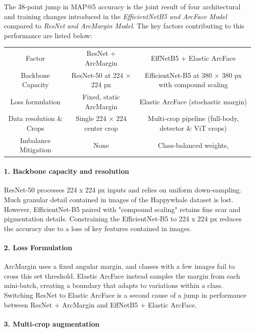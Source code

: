 \documentclass[twocolumn]{article}
\begin{document}
The 38-point jump in MAP@5 accuracy is the joint result of four architectural and training changes introduced in the \textit{EfficientNetB5 and ArcFace Model} compared to \textit{ResNet and ArcMargin Model}. The key factors contributing to this performance are listed below:

\begin{table}
    \centering
    \begin{tabular}{ccc}
         Factor&  ResNet + ArcMargin& EffNetB5 + Elastic ArcFace\\
         Backbone Capacity&  ResNet-50 at 224 × 224 px& EfficientNet-B5 at 380 × 380 px with compound scaling\\
         Loss formulation&  Fixed, static ArcMargin& Elastic ArcFace (stochastic margin)\\
         Data resolution \& Crops&  Single 224 × 224 center crop& Multi-crop pipeline (full-body, detector \& ViT crops)\\
         Imbalance Mitigation&  None& Class-balanced weights,\\
    \end{tabular}
    \label{tab:my_label}
\end{table}

\paragraph{1. Backbone capacity and resolution}

ResNet-50 processes 224 x 224 px inputs and relies on uniform down-sampling. Much granular detail contained in images of the Happywhale dataset is lost. However, EfficientNet-B5 paired with "compound scaling" retains fine scar and pigmentation details. Constraining the EfficientNet-B5 to 224 x 224 px reduces the accuracy due to a loss of key features contained in images. 

\paragraph{2. Loss Formulation}

ArcMargin uses a fixed angular margin, and classes with a few images fail to cross this set threshold. Elastic ArcFace instead samples the margin from each mini-batch, creating a boundary that adapts to variations within a class. Switching ResNet to Elastic ArcFace is a second cause of a jump in performance between ResNet + ArcMargin and EffNetB5 + Elastic ArcFace.

\paragraph{3. Multi-crop augmentation}
\end{document}
